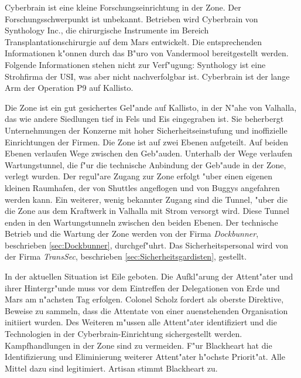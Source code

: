 
Cyberbrain ist eine kleine Forschungseinrichtung in der Zone. Der Forschungsschwerpunkt ist unbekannt. Betrieben wird Cyberbrain von Synthology Inc., die chirurgische Instrumente im Bereich Transplantationschirurgie auf dem Mars entwickelt. Die entsprechenden Informationen k"onnen durch das B"uro von Vandermool bereitgestellt werden. Folgende Informationen stehen nicht zur Verf"ugung: Synthology ist eine Strohfirma der USI, was aber nicht nachverfolgbar ist. Cyberbrain ist der lange Arm der Operation P9 auf Kallisto.

Die Zone ist ein gut gesichertes Gel"ande auf Kallisto, in der N"ahe von Valhalla, das wie andere Siedlungen tief in Fels und Eis eingegraben ist. Sie beherbergt Unternehmungen der Konzerne mit hoher Sicherheitseinstufung und inoffizielle Einrichtungen der Firmen. Die Zone ist auf zwei Ebenen aufgeteilt. Auf beiden Ebenen verlaufen Wege zwischen den Geb"auden. Unterhalb der Wege verlaufen Wartungstunnel, die f"ur die technische Anbindung der Geb"aude in der Zone, verlegt wurden. Der regul"are Zugang zur Zone erfolgt "uber einen eigenen kleinen Raumhafen, der von Shuttles angeflogen und von Buggys angefahren werden kann. Ein weiterer, wenig bekannter Zugang sind die Tunnel, "uber die die Zone aus dem Kraftwerk in Valhalla mit Strom versorgt wird. Diese Tunnel enden in den Wartungstunneln zwischen den beiden Ebenen. Der technische Betrieb und die Wartung der Zone werden von der Firma \emph{Dockbunner}, beschrieben \cref{sec:Dockbunner}, durchgef"uhrt. Das Sicherheitspersonal wird von der Firma \emph{TransSec}, beschrieben \cref{sec:Sicherheitsgardisten}, gestellt. 

In der aktuellen Situation ist Eile geboten. Die Aufkl"arung der Attent"ater und ihrer Hintergr"unde muss vor dem Eintreffen der Delegationen von Erde und Mars am n"achsten Tag erfolgen. Colonel Scholz fordert als oberste Direktive, Beweise zu sammeln, dass die Attentate von einer au\3enstehenden Organisation initiiert wurden. Des Weiteren m"ussen alle Attent"ater identifiziert und die Technologien in der Cyberbrain-Einrichtung sichergestellt werden. Kampfhandlungen in der Zone sind zu vermeiden. F"ur Blackheart hat die Identifizierung und Eliminierung weiterer Attent"ater h"ochste Priorit"at. Alle Mittel dazu sind legitimiert. Artisan stimmt Blackheart zu.

